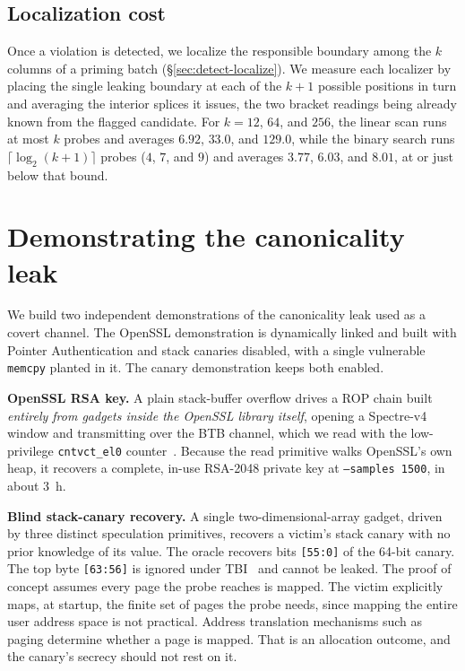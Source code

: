 \documentclass[letterpaper,twocolumn,10pt]{article}
\theoremstyle{definition}
\begin{document}
\subsection{Localization cost}
\label{sec:eval-localize}
Once a violation is detected, we localize the responsible boundary among the
$k$ columns of a priming batch (\S\ref{sec:detect-localize}).
We measure each localizer by placing the single leaking boundary at each of the $k+1$
possible positions in turn and averaging the interior splices it issues, the two bracket
readings being already known from the flagged candidate. For $k=12$, $64$, and $256$, the
linear scan runs at most $k$ probes and averages $6.92$, $33.0$, and $129.0$, while the
binary search runs $\lceil\log_2(k{+}1)\rceil$ probes ($4$, $7$, and $9$) and averages
$3.77$, $6.03$, and $8.01$, at or just below that bound.

\section{Demonstrating the canonicality leak}
\label{sec:canon}
We build two independent demonstrations of the canonicality leak used as a covert channel. The
OpenSSL demonstration is dynamically
linked and built with Pointer Authentication and stack canaries disabled, with a single vulnerable
\texttt{memcpy} planted in it. The canary demonstration keeps both enabled.

\textbf{OpenSSL RSA key.} A plain stack-buffer overflow drives a ROP chain built
\emph{entirely from gadgets inside the OpenSSL library itself}, opening a Spectre-v4
window and transmitting over the BTB channel, which we read with the low-privilege
\texttt{cntvct\_el0} counter~\cite{riscyrop}. Because the read primitive walks OpenSSL's
own heap, it recovers a complete, in-use RSA-2048 private key at \texttt{--samples 1500},
in about $3$~h.

\textbf{Blind stack-canary recovery.} A single two-dimensional-array gadget, driven by
three distinct speculation primitives, recovers a victim's stack canary with no prior
knowledge of its value. The oracle recovers bits \texttt{[55:0]} of the 64-bit canary.
The top byte \texttt{[63:56]} is ignored under TBI~\cite{arm_tbi} and cannot be leaked. The proof of concept assumes every
page the probe reaches is mapped. The victim explicitly maps, at startup, the finite set
of pages the probe needs, since mapping the entire user address space is not practical.
Address translation mechanisms such as paging determine whether a page is mapped. That is an
allocation outcome, and the canary's secrecy should not rest on it.
\end{document}
